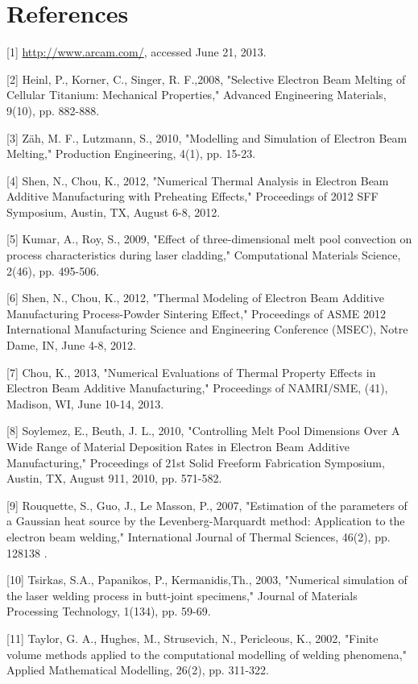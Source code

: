 \documentclass[10pt]{article}
\begin{document}
\section*{References}
[1] \href{http://www.arcam.com/}{http://www.arcam.com/}, accessed June 21, 2013.

[2] Heinl, P., Korner, C., Singer, R. F.,2008, "Selective Electron Beam Melting of Cellular Titanium: Mechanical Properties," Advanced Engineering Materials, 9(10), pp. 882-888.

[3] Zäh, M. F., Lutzmann, S., 2010, "Modelling and Simulation of Electron Beam Melting," Production Engineering, 4(1), pp. 15-23.

[4] Shen, N., Chou, K., 2012, "Numerical Thermal Analysis in Electron Beam Additive Manufacturing with Preheating Effects," Proceedings of 2012 SFF Symposium, Austin, TX, August 6-8, 2012.

[5] Kumar, A., Roy, S., 2009, "Effect of three-dimensional melt pool convection on process characteristics during laser cladding," Computational Materials Science, 2(46), pp. 495-506.

[6] Shen, N., Chou, K., 2012, "Thermal Modeling of Electron Beam Additive Manufacturing Process-Powder Sintering Effect," Proceedings of ASME 2012 International Manufacturing Science and Engineering Conference (MSEC), Notre Dame, IN, June 4-8, 2012.

[7] Chou, K., 2013, "Numerical Evaluations of Thermal Property Effects in Electron Beam Additive Manufacturing," Proceedings of NAMRI/SME, (41), Madison, WI, June 10-14, 2013.

[8] Soylemez, E., Beuth, J. L., 2010, "Controlling Melt Pool Dimensions Over A Wide Range of Material Deposition Rates in Electron Beam Additive Manufacturing," Proceedings of 21st Solid Freeform Fabrication Symposium, Austin, TX, August 911, 2010, pp. 571-582.

[9] Rouquette, S., Guo, J., Le Masson, P., 2007, "Estimation of the parameters of a Gaussian heat source by the Levenberg-Marquardt method: Application to the electron beam welding," International Journal of Thermal Sciences, 46(2), pp. 128138 .

[10] Tsirkas, S.A., Papanikos, P., Kermanidis,Th., 2003, "Numerical simulation of the laser welding process in butt-joint specimens," Journal of Materials Processing Technology, 1(134), pp. 59-69.

[11] Taylor, G. A., Hughes, M., Strusevich, N., Pericleous, K., 2002, "Finite volume methods applied to the computational modelling of welding phenomena," Applied Mathematical Modelling, 26(2), pp. 311-322.
\end{document}
